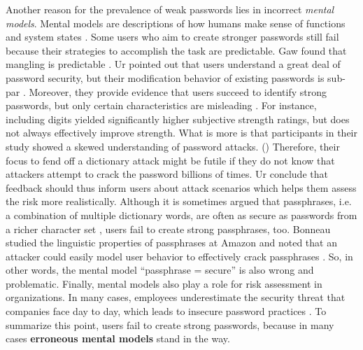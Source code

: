 	Another reason for the prevalence of weak passwords lies in incorrect \textit{mental models}. Mental models are descriptions of how humans make sense of functions and system states \cite{Volkamer2013MentalModels}. 
	Some users who aim to create stronger passwords still fail because their strategies to accomplish the task are predictable. Gaw \etal found that mangling is predictable \cite{Gaw2005ReuseRecycle}. Ur \etal pointed out that users understand a great deal of password security, but their modification behavior of existing passwords is sub-par \cite{Ur2015PWCreationLab}. Moreover, they provide evidence that users succeed to identify strong passwords, but only certain characteristics are misleading \cite{Ur2016PerceptionsPassword}. For instance, including digits yielded significantly higher subjective strength ratings, but does not always effectively improve strength. What is more is that participants in their study showed a skewed understanding of password attacks. () Therefore, their focus to fend off a dictionary attack might be futile if they do not know that attackers attempt to crack the password billions of times. Ur \etal conclude that feedback should thus inform users about attack scenarios which helps them assess the risk more realistically. Although it is sometimes argued that passphrases, i.e. a combination of multiple dictionary words, are often as secure as passwords from a richer character set \cite{Shay2012CorrectHorseBatteryStaple}, users fail to create strong passphrases, too. Bonneau studied the linguistic properties of passphrases at Amazon and noted that an attacker could easily model user behavior to effectively crack passphrases \cite{Bonneau2012LinguisticProperties}. So, in other words, the mental model ``passphrase = secure'' is also wrong and problematic. Finally, mental models also play a role for risk assessment in organizations. In many cases, employees underestimate the security threat that companies face day to day, which leads to insecure password practices \cite{Adams1999UsersEnemy, Weirich2001PrettyGoodPersuasion}. To summarize this point, users fail to create strong passwords, because in many cases \textbf{erroneous mental models} stand in the way.
	
